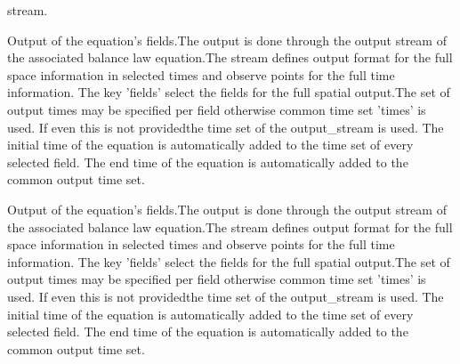 \begin{RecordType}{}{}{}{}
{{{stream.}}}\end{RecordType}\begin{RecordType}{}{}{}{}{{{Output of the equation's fields.The output is done through the output stream of the associated balance law equation.The stream defines output format for the full space information in selected times and observe points for the full time information. The key 'fields' select the fields for the full spatial output.The set of output times may be specified  per field otherwise common time set 'times' is used. If even this is not providedthe time set of the output\_stream is used. The initial time of the equation is automatically added to the time set of every selected field. The end time of the equation is automatically added to the common output time set.}}}\end{RecordType}\begin{RecordType}{}{}{}{}{{{Output of the equation's fields.The output is done through the output stream of the associated balance law equation.The stream defines output format for the full space information in selected times and observe points for the full time information. The key 'fields' select the fields for the full spatial output.The set of output times may be specified  per field otherwise common time set 'times' is used. If even this is not providedthe time set of the output\_stream is used. The initial time of the equation is automatically added to the time set of every selected field. The end time of the equation is automatically added to the common output time set.}}}
\end{RecordType}
